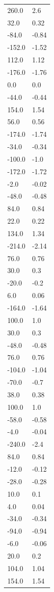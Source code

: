 \begin{longtable}{ll}
260.0 & 2.6 \\
32.0 & 0.32 \\
-84.0 & -0.84 \\
-152.0 & -1.52 \\
112.0 & 1.12 \\
-176.0 & -1.76 \\
0.0 & 0.0 \\
-44.0 & -0.44 \\
154.0 & 1.54 \\
56.0 & 0.56 \\
-174.0 & -1.74 \\
-34.0 & -0.34 \\
-100.0 & -1.0 \\
-172.0 & -1.72 \\
-2.0 & -0.02 \\
-48.0 & -0.48 \\
84.0 & 0.84 \\
22.0 & 0.22 \\
134.0 & 1.34 \\
-214.0 & -2.14 \\
76.0 & 0.76 \\
30.0 & 0.3 \\
-20.0 & -0.2 \\
6.0 & 0.06 \\
-164.0 & -1.64 \\
100.0 & 1.0 \\
30.0 & 0.3 \\
-48.0 & -0.48 \\
76.0 & 0.76 \\
-104.0 & -1.04 \\
-70.0 & -0.7 \\
38.0 & 0.38 \\
100.0 & 1.0 \\
-58.0 & -0.58 \\
-4.0 & -0.04 \\
-240.0 & -2.4 \\
84.0 & 0.84 \\
-12.0 & -0.12 \\
-28.0 & -0.28 \\
10.0 & 0.1 \\
4.0 & 0.04 \\
-34.0 & -0.34 \\
-94.0 & -0.94 \\
-6.0 & -0.06 \\
20.0 & 0.2 \\
104.0 & 1.04 \\
154.0 & 1.54 \\

\end{longtable}

